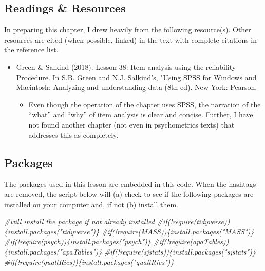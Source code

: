 \documentclass[
  english,
]{book}
\newenvironment{Shaded}{\begin{snugshade}}{\end{snugshade}}
\newcommand{\CommentTok}[1]{\textcolor[rgb]{0.56,0.35,0.01}{\textit{#1}}}
\providecommand{\tightlist}{%
  \setlength{\itemsep}{0pt}\setlength{\parskip}{0pt}}
\begin{document}
\hypertarget{readings-resources-5}{%
\subsection{Readings \& Resources}\label{readings-resources-5}}

In preparing this chapter, I drew heavily from the following resource(s). Other resources are cited (when possible, linked) in the text with complete citations in the reference list.

\begin{itemize}
\tightlist
\item
  Green \& Salkind (2018). Lesson 38: Item analysis using the reliability Procedure. In S.B. Green and N.J. Salkind's, "Using SPSS for Windows and Macintosh: Analyzing and understanding data (8th ed). New York: Pearson.

  \begin{itemize}
  \tightlist
  \item
    Even though the operation of the chapter uses SPSS, the narration of the ``what'' and ``why'' of item analysis is clear and concise. Further, I have not found another chapter (not even in psychometrics texts) that addresses this as completely.
  \end{itemize}
\end{itemize}

\hypertarget{packages-5}{%
\subsection{Packages}\label{packages-5}}

The packages used in this lesson are embedded in this code. When the hashtags are removed, the script below will (a) check to see if the following packages are installed on your computer and, if not (b) install them.

\begin{Shaded}
\begin{Highlighting}[]
\CommentTok{\#will install the package if not already installed}
\CommentTok{\#if(!require(tidyverse))\{install.packages("tidyverse")\}}
\CommentTok{\#if(!require(MASS))\{install.packages("MASS")\}}
\CommentTok{\#if(!require(psych))\{install.packages("psych")\}}
\CommentTok{\#if(!require(apaTables))\{install.packages("apaTables")\}}
\CommentTok{\#if(!require(sjstats))\{install.packages("sjstats")\}}
\CommentTok{\#if(!require(qualtRics))\{install.packages("qualtRics")\}}
\end{Highlighting}
\end{Shaded}
\end{document}
